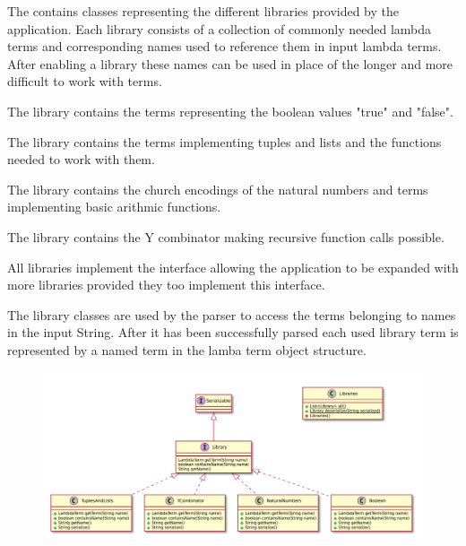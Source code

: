 The \texttt{} contains classes representing the different libraries provided by the application.
Each library consists of a collection of commonly needed lambda terms and corresponding names used to reference them in input lambda terms.
After enabling a library  these names can be used in place of the longer and more difficult to work with terms.

The \texttt{} library contains the terms representing the boolean values "true" and "false".

The \texttt{} library contains the terms implementing tuples and lists and the functions needed to work with them.

The \texttt{} library contains the church encodings of the natural numbers and terms implementing basic arithmic functions.

The \texttt{} library contains the Y combinator making recursive function calls possible.

All libraries implement the {} interface allowing the application to be expanded with more libraries provided they too implement this interface.

The library classes are used by the parser to access the terms belonging to names in the input String. 
After it has been successfully parsed each used library term is represented by a named term in the lamba term object structure.

\begin{figure}[H]
	\centering
	\includegraphics[width=\textwidth]{packageDiagrams/libraryPackage}
\end{figure}